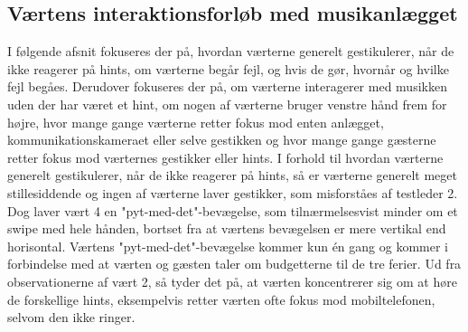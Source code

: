 \subsection{Værtens interaktionsforløb med musikanlægget}
\label{TestresultaterSocialAcceptVaertsGestikker}
%
I følgende afsnit fokuseres der på, hvordan værterne generelt gestikulerer, når de ikke reagerer på hints, om værterne begår fejl, og hvis de gør, hvornår og hvilke fejl begåes. Derudover fokuseres der på, om værterne interagerer med musikken uden der har været et hint, om nogen af værterne bruger venstre hånd frem for højre, hvor mange gange værterne retter fokus mod enten anlægget, kommunikationskameraet eller selve gestikken og hvor mange gange gæsterne retter fokus mod værternes gestikker eller hints.\blankline
%
I forhold til hvordan værterne generelt gestikulerer, når de ikke reagerer på hints, så er værterne generelt meget stillesiddende og ingen af værterne laver gestikker, som misforståes af testleder 2. Dog laver vært 4 en "pyt-med-det"-bevægelse, som tilnærmelsesvist minder om et swipe med hele hånden, bortset fra at værtens bevægelsen er mere vertikal end horisontal. Værtens "pyt-med-det"-bevægelse kommer kun én gang og kommer i forbindelse med at værten og gæsten taler om budgetterne til de tre ferier. Ud fra observationerne af vært 2, så tyder det på, at værten koncentrerer sig om at høre de forskellige hints, eksempelvis retter værten ofte fokus mod mobiltelefonen, selvom den ikke ringer.\blankline
%
